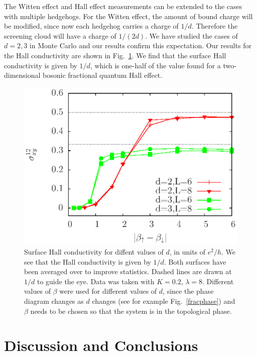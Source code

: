 \documentclass[prb,twocolumn]{revtex4-1}
\begin{document}
The Witten effect and Hall effect measurements can be extended to the cases with multiple hedgehogs. For the Witten effect, the amount of bound charge will be modified, since now each hedgehog carries a charge of $1/d$. Therefore the screening cloud will have a charge of $1/(2d)$. We have studied the cases of $d=2,3$ in Monte Carlo and our results confirm this expectation. 
Our results for the Hall conductivity are shown in Fig.~\ref{halldiff}. We find that the surface Hall conductivity is given by $1/d$, which is one-half of the value found for a two-dimensional bosonic fractional quantum Hall effect.

\begin{figure}
\includegraphics[width=0.9\linewidth]{figures/halldiff.eps}
\caption{Surface Hall conductivity for diffent values of $d$, in units of $e^2/h$. We see that the Hall conductivity is given by $1/d$. Both surfaces have been averaged over to improve statistics. Dashed lines are drawn at $1/d$ to guide the eye. Data was taken with $K=0.2$, $\lambda=8$. Different values of $\beta$ were used for different values of $d$, since the phase diagram changes as $d$ changes (see for example Fig.~\ref{fracphase}) and $\beta$ needs to be chosen so that the system is in the topological phase.}
\label{halldiff}
\end{figure}


\section{Discussion and Conclusions}


\end{document}
